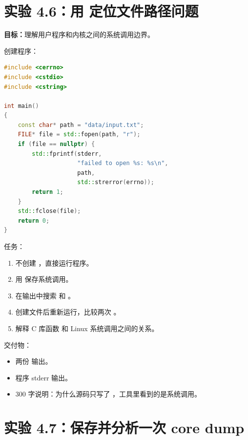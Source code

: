 \section{实验 4.6：用  定位文件路径问题}

\begin{labbox}
\textbf{目标：}理解用户程序和内核之间的系统调用边界。

创建程序：

\begin{lstlisting}[language=C++]
#include <cerrno>
#include <cstdio>
#include <cstring>

int main()
{
    const char* path = "data/input.txt";
    FILE* file = std::fopen(path, "r");
    if (file == nullptr) {
        std::fprintf(stderr,
                     "failed to open %s: %s\n",
                     path,
                     std::strerror(errno));
        return 1;
    }
    std::fclose(file);
    return 0;
}
\end{lstlisting}

任务：

\begin{enumerate}
  \item 不创建 ，直接运行程序。
  \item 用  保存系统调用。
  \item 在输出中搜索  和 。
  \item 创建文件后重新运行，比较两次 。
  \item 解释 C 库函数  和 Linux 系统调用之间的关系。
\end{enumerate}

交付物：

\begin{itemize}
  \item 两份  输出。
  \item 程序 stderr 输出。
  \item 300 字说明：为什么源码只写了 ，工具里看到的是系统调用。
\end{itemize}
\end{labbox}

\section{实验 4.7：保存并分析一次 core dump}


